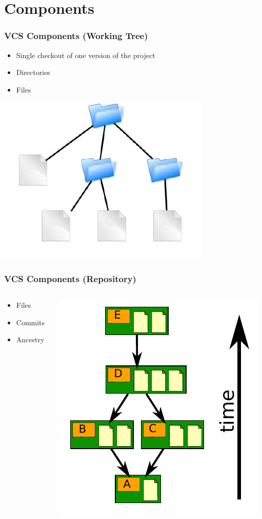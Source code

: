 \documentclass[english,compress]{beamer}
\begin{document}
\section{Components}
\frame
{
    \frametitle{VCS Components (Working Tree)}

    \begin{itemize}
        \item Single checkout of one version of the project
        \item Directories
        \item Files
    \end{itemize}
    \begin{center}
        \includegraphics[height=.3\textwidth]{figs/working-tree.png}
    \end{center}
}

\frame
{
    \frametitle{VCS Components (Repository)}

    \begin{columns}
        \begin{column}{.5\textwidth}
    \begin{itemize}
        \item Files
        \item Commits
        \item Ancestry
    \end{itemize}
\end{column}
\begin{column}{.5\textwidth}
    \includegraphics[width=.8\textwidth]{figs/repo.png}
\end{column}
\end{columns}
}
\end{document}
